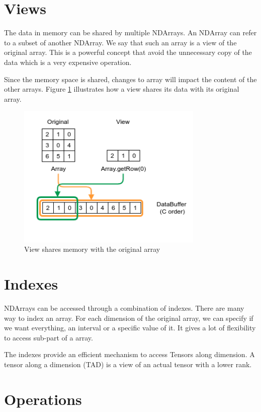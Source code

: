\section{Views}
\label{sec:viewsDesc}
The data in memory can be shared by multiple NDArrays. An NDArray can refer to a subset of another NDArray. We say that such an array is a view of the original array. This is a powerful concept that avoid the unnecessary copy of the data which is a very expensive operation.

Since the memory space is shared, changes to array will impact the content of the other arrays. Figure \ref{fig:sharememView} illustrates how a view shares its data with its original array.


\begin{figure}[!h]
	\begin{center}
		\includegraphics[width=3.5in]{images/views.png} 

		\caption{View shares memory with the original array}
	\end{center}
	\label{fig:sharememView}
\end{figure}


\section{Indexes}

NDArrays can be accessed through a combination of indexes. There are many way to index an array. For each dimension of the original array, we can specify if we want everything, an interval or a specific value of it. It gives a lot of flexibility to access sub-part of a array. 
 
The indexes provide an efficient mechanism to access Tensors along dimension. A tensor along a dimension (TAD) is a view of an actual tensor with a lower rank.

\section{Operations}

